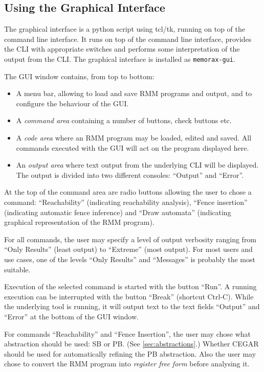 \documentclass[a4paper]{article}
\newcommand{\gui}{memorax-gui} %
\begin{document}
\subsection{Using the Graphical Interface}

The graphical interface is a python script using tcl/tk, running on
top of the command line interface. It runs on top of the command line
interface, provides the CLI with appropriate switches and performs
some interpretation of the output from the CLI. The graphical
interface is installed as {\tt \gui{}}.

The GUI window contains, from top to bottom:

\begin{itemize}
\item A menu bar, allowing to load and save RMM programs and output,
  and to configure the behaviour of the GUI.
\item A \emph{command area} containing a number of buttons, check buttons etc.
\item A \emph{code area} where an RMM program may be loaded, edited
  and saved. All commands executed with the GUI will act on the
  program displayed here.
\item An \emph{output area} where text output from the underlying CLI
  will be displayed. The output is divided into two different
  consoles: ``Output'' and ``Error''.
\end{itemize}

At the top of the command area are radio buttons allowing the user to
chose a command: ``Reachability'' (indicating reachability analysis),
``Fence insertion'' (indicating automatic fence inference) and ``Draw
automata'' (indicating graphical representation of the RMM program).

For all commands, the user may specify a level of output verbosity
ranging from ``Only Results'' (least output) to ``Extreme'' (most
output). For most users and use cases, one of the levels ``Only
Results'' and ``Messages'' is probably the most suitable.

Execution of the selected command is started with the button
``Run''. A running execution can be interrupted with the button
``Break'' (shortcut Ctrl-C). While the underlying tool is running, it
will output text to the text fields ``Output'' and ``Error'' at the
bottom of the GUI window.

For commands ``Reachability'' and ``Fence Insertion'', the user may
chose what abstraction should be used: SB or PB. (See
\cref{sec:abstractions}.) Whether CEGAR should be used for
automatically refining the PB abstraction. Also the user may chose to
convert the RMM program into \emph{register free form} before
analysing it. \explainrff
\end{document}
